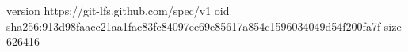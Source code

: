 version https://git-lfs.github.com/spec/v1
oid sha256:913d98faacc21aa1fac83fc84097ee69e85617a854c1596034049d54f200fa7f
size 626416
